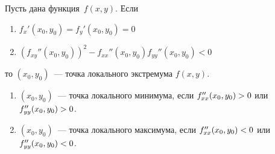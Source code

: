\begin{theorem}
Пусть дана функция~$f(x, y)$. Если
\begin{enumerate}
	\item $\displaystyle f_x'(x_0, y_0) = f_y'(x_0, y_0) = 0$
	\item $\displaystyle (f_{xy}''(x_0, y_0))^2 - f_{xx}''(x_0, y_0) f_{yy}''(x_0, y_0) < 0$
\end{enumerate}
то $(x_0, y_0)$~--- точка локального экстремума $f(x, y)$.
	
\begin{enumerate}
	\item $(x_0, y_0)$~--- точка локального минимума,
	если $f_{xx}''(x_0, y_0) \opbr> 0$ или~$f_{yy}''(x_0, y_0) \opbr> 0$.
	\item $(x_0, y_0)$~--- точка локального максимума,
	если $f_{xx}''(x_0, y_0) \opbr< 0$ или~$f_{yy}''(x_0, y_0) \opbr< 0$.
\end{enumerate}
\end{theorem}
